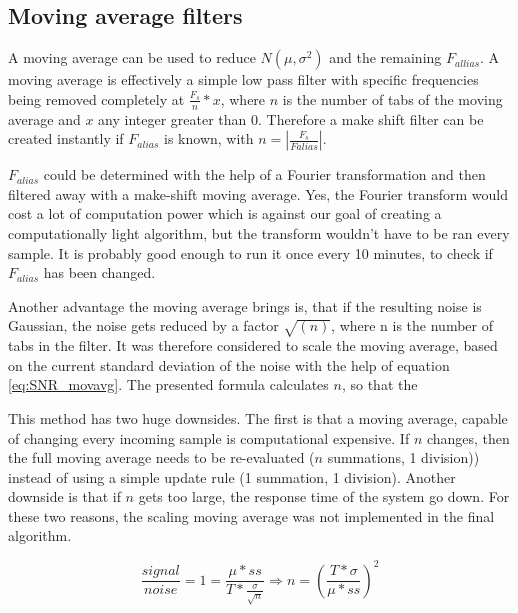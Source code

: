\subsection{Moving average filters}
A moving average can be used to reduce $N(\mu,\sigma^2)$ and the remaining $F_{allias}$. A moving average is effectively a simple low pass filter with specific frequencies being removed completely at $\frac{F_s}{n}*x$, where $n$ is the number of tabs of the moving average and $x$ any integer greater than 0. Therefore a make shift filter can be created instantly if $F_{alias}$ is known, with $n = \left|\frac{F_{s}}{F{alias}}\right|$.

$F_{alias}$ could be determined with the help of a Fourier transformation and then filtered away with a make-shift moving average. Yes, the Fourier transform would cost a lot of computation power which is against our goal of creating a computationally light algorithm, but the transform wouldn't have to be ran every sample. It is probably good enough to run it once every 10 minutes, to check if $F_{alias}$ has been changed.

Another advantage the moving average brings is, that if the resulting noise is Gaussian, the noise gets reduced by a factor $\sqrt{(n)}$, where n is the number of tabs in the filter. It was therefore considered to scale the moving average, based on the current standard deviation of the noise with the help of equation \ref{eq:SNR_movavg}. The presented formula calculates $n$, so that the 

This method has two huge downsides. The first is that a moving average, capable of changing every incoming sample is computational expensive. If $n$ changes, then the full moving average needs to be re-evaluated ($n$ summations, 1 division)) instead of using a simple update rule (1 summation, 1 division). Another downside is that if $n$ gets too large, the response time of the system go down. For these two reasons, the scaling moving average was not implemented in the final algorithm.

\begin{equation}
\label{eq:SNR_movavg}
\frac{signal}{noise} = 1 = \frac{\mu * ss}{T * \frac{\sigma}{\sqrt{n}}} \Rightarrow n = \left(\frac{T * \sigma}{\mu*ss}\right)^2
\end{equation}

